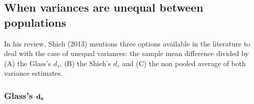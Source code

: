 \documentclass[
  english,
  man,floatsintext]{apa6}
\begin{document}
\hypertarget{when-variances-are-unequal-between-populations}{%
\subsection{When variances are unequal between populations}\label{when-variances-are-unequal-between-populations}}

In his review, Shieh (2013) mentions three options available in the literature to deal with the case of unequal variances: the sample mean difference divided by (A) the Glass's \(d_s\), (B) the Shieh's \(d_s\) and (C) the non pooled average of both variance estimates.

\hypertarget{glasss-bf-d_s}{%
\subsubsection{\texorpdfstring{Glass's \(\bf d_s\)}{Glass's \textbackslash bf d\_s}}\label{glasss-bf-d_s}}
\end{document}
